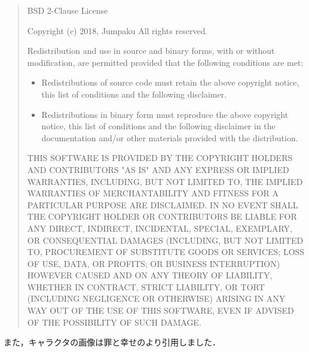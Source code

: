\begin{quote}
BSD 2-Clause License

Copyright (c) 2018, Jumpaku
All rights reserved.

Redistribution and use in source and binary forms, with or without
modification, are permitted provided that the following conditions are met:
\begin{itemize}
\item Redistributions of source code must retain the above copyright notice, this
  list of conditions and the following disclaimer.
\item Redistributions in binary form must reproduce the above copyright notice,
  this list of conditions and the following disclaimer in the documentation
  and/or other materials provided with the distribution.
\end{itemize}
THIS SOFTWARE IS PROVIDED BY THE COPYRIGHT HOLDERS AND CONTRIBUTORS "AS IS"
AND ANY EXPRESS OR IMPLIED WARRANTIES, INCLUDING, BUT NOT LIMITED TO, THE
IMPLIED WARRANTIES OF MERCHANTABILITY AND FITNESS FOR A PARTICULAR PURPOSE ARE
DISCLAIMED. IN NO EVENT SHALL THE COPYRIGHT HOLDER OR CONTRIBUTORS BE LIABLE
FOR ANY DIRECT, INDIRECT, INCIDENTAL, SPECIAL, EXEMPLARY, OR CONSEQUENTIAL
DAMAGES (INCLUDING, BUT NOT LIMITED TO, PROCUREMENT OF SUBSTITUTE GOODS OR
SERVICES; LOSS OF USE, DATA, OR PROFITS; OR BUSINESS INTERRUPTION) HOWEVER
CAUSED AND ON ANY THEORY OF LIABILITY, WHETHER IN CONTRACT, STRICT LIABILITY,
OR TORT (INCLUDING NEGLIGENCE OR OTHERWISE) ARISING IN ANY WAY OUT OF THE USE
OF THIS SOFTWARE, EVEN IF ADVISED OF THE POSSIBILITY OF SUCH DAMAGE.
\end{quote}

また，キャラクタの画像は罪と幸せのより引用しました．